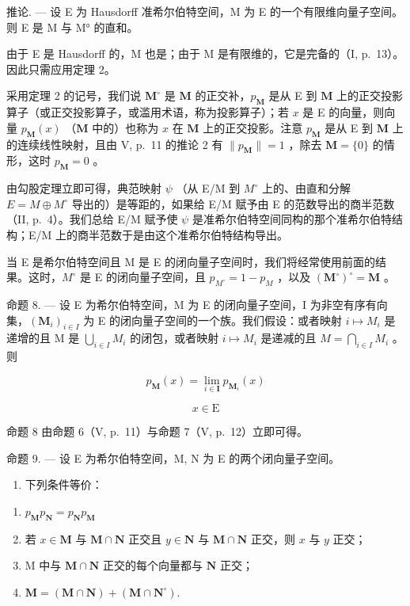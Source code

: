 推论. --- 设 E 为 Hausdorff 准希尔伯特空间，M 为 E 的一个有限维向量子空间。则 E 是 M 与 M° 的直和。

由于 E 是 Hausdorff 的，M 也是；由于 M 是有限维的，它是完备的（I, p.~13）。因此只需应用定理 2。

采用定理 2 的记号，我们说 \(\mathbf{M}^{\circ}\) 是 \(\mathbf{M}\) 的正交补，\(p_{\mathbf{M}}\) 是从 E 到 \(\mathbf{M}\) 上的正交投影算子（或正交投影算子，或滥用术语，称为投影算子）；若 \(x\) 是 E 的向量，则向量 \(p_{\mathbf{M}}(x)\) （\(\mathbf{M}\) 中的）也称为 \(x\) 在 \(\mathbf{M}\) 上的正交投影。注意 \(p_{\mathbf{M}}\) 是从 E 到 \(\mathbf{M}\) 上的连续线性映射，且由 V, p.~11 的推论 2 有 \(\| p_{\mathbf{M}} \| = 1\) ，除去 \(\mathbf{M} = \{0\}\) 的情形，这时 \(p_{\mathbf{M}} = 0\) 。

由勾股定理立即可得，典范映射 \(\psi\) （从 E/M 到 \(M^{\circ}\) 上的、由直和分解 \(E = M \oplus M^{\circ}\) 导出的）是等距的，如果给 E/M 赋予由 E 的范数导出的商半范数（II, p.~4）。我们总给 E/M 赋予使 \(\psi\) 是准希尔伯特空间同构的那个准希尔伯特结构；E/M 上的商半范数于是由这个准希尔伯特结构导出。

当 E 是希尔伯特空间且 M 是 E 的闭向量子空间时，我们将经常使用前面的结果。这时，\(M^{\circ}\) 是 E 的闭向量子空间，且 \(p_{M^{\circ}} = 1 - p_{M}\) ，以及 \((\mathbf{M}^{\circ})^{\circ} = \mathbf{M}\) 。

命题 8. --- 设 E 为希尔伯特空间，M 为 E 的闭向量子空间，I 为非空有序有向集，\((\mathbf{M}_{i})_{i\in I}\) 为 E 的闭向量子空间的一个族。我们假设：或者映射 \(i\mapsto M_{i}\) 是递增的且 M 是 \(\bigcup_{i\in I}M_{i}\) 的闭包，或者映射 \(i\mapsto M_{i}\) 是递减的且 \(M=\bigcap_{i\in I}M_{i}\) 。则

\[
p _ {\mathbf {M}} (x) = \lim _ {i \in \mathbf {I}} p _ {\mathbf {M} _ {i}} (x)
\]

\[
x \in \mathrm{E}
\]

命题 8 由命题 6（V, p.~11）与命题 7（V, p.~12）立即可得。

命题 9. --- 设 E 为希尔伯特空间，M, N 为 E 的两个闭向量子空间。

\begin{enumerate}
\def\labelenumi{\alph{enumi})}
\tightlist
\item
  下列条件等价：
\end{enumerate}

\begin{enumerate}
\def\labelenumi{(\roman{enumi})}
\item
  \(p_{\mathbf{M}}p_{\mathbf{N}} = p_{\mathbf{N}}p_{\mathbf{M}}\)
\item
  若 \(x \in \mathbf{M}\) 与 \(\mathbf{M} \cap \mathbf{N}\) 正交且 \(y \in \mathbf{N}\) 与 \(\mathbf{M} \cap \mathbf{N}\) 正交，则 \(x\) 与 \(y\) 正交；
\item
  M 中与 \(\mathbf{M} \cap \mathbf{N}\) 正交的每个向量都与 \(\mathbf{N}\) 正交；
\item
  \(\mathbf{M} = (\mathbf{M}\cap \mathbf{N}) + (\mathbf{M}\cap \mathbf{N}^{\circ}).\)
\end{enumerate}

